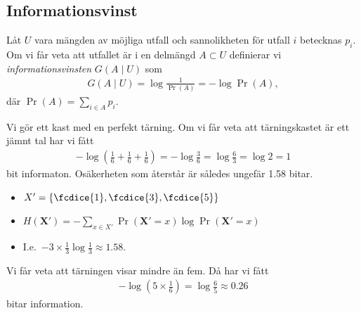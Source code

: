 \documentclass{beamer}
\let\stoch\mathbf{}
\begin{document}
\subsection{Informationsvinst}

\begin{frame}
  \begin{definition}
    Låt \(U\) vara mängden av möjliga utfall och sannolikheten för utfall \(i\) 
    betecknas \(p_i\).
    Om vi får veta att utfallet är i en delmängd \(A\subset U\) definierar vi 
    \emph{informationsvinsten} \(G(A\mid U)\) som
    \begin{align*}
      G(A\mid U) = \log\frac{1}{\Pr(A)} = -\log\Pr(A),
    \end{align*}
    där \(\Pr(A) = \sum_{i\in A} p_i\).
  \end{definition}
\end{frame}

\begin{frame}
  \begin{example}
    Vi gör ett kast med en perfekt tärning.
    Om vi får veta att tärningskastet är ett jämnt tal har vi fått
    \begin{align*}
      -\log\left( \frac{1}{6} + \frac{1}{6} + \frac{1}{6}\right) =
      -\log\frac{3}{6} = \log\frac{6}{3} = \log 2 = 1
    \end{align*}
    bit informaton.
    Osäkerheten som återstår är således ungefär 1.58 bitar.
  \end{example}

  \pause{}

  \begin{remark}
    \begin{itemize}
      \item \(X' = \{\fcdice{1}, \fcdice{3}, \fcdice{5}\}\)
      \item \(H(\stoch X') = - \sum_{x\in X'} \Pr(\stoch X' = x)\log \Pr(\stoch 
          X' = x)\)
      \item I.e.\ \(- 3 \times \frac{1}{3}\log\frac{1}{3} \approx 1.58\).
    \end{itemize}
  \end{remark}
\end{frame}

\begin{frame}
  \begin{example}
    Vi får veta att tärningen visar mindre än fem.
    Då har vi fått
    \begin{align*}
      -\log\left( 5\times\frac{1}{6}\right) = \log\frac{6}{5}\approx 0.26
    \end{align*}
    bitar information.
  \end{example}
\end{frame}
\end{document}
